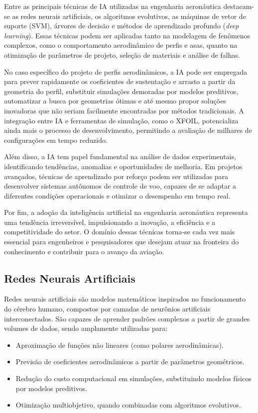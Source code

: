 Entre as principais técnicas de IA utilizadas na engenharia aeronáutica destacam-se as redes neurais artificiais, os algoritmos evolutivos, as máquinas de vetor de suporte (SVM), árvores de decisão e métodos de aprendizado profundo (\textit{deep learning}). Essas técnicas podem ser aplicadas tanto na modelagem de fenômenos complexos, como o comportamento aerodinâmico de perfis e asas, quanto na otimização de parâmetros de projeto, seleção de materiais e análise de falhas.

No caso específico do projeto de perfis aerodinâmicos, a IA pode ser empregada para prever rapidamente os coeficientes de sustentação e arrasto a partir da geometria do perfil, substituir simulações demoradas por modelos preditivos, automatizar a busca por geometrias ótimas e até mesmo propor soluções inovadoras que não seriam facilmente encontradas por métodos tradicionais. A integração entre IA e ferramentas de simulação, como o XFOIL, potencializa ainda mais o processo de desenvolvimento, permitindo a avaliação de milhares de configurações em tempo reduzido.

Além disso, a IA tem papel fundamental na análise de dados experimentais, identificando tendências, anomalias e oportunidades de melhoria. Em projetos avançados, técnicas de aprendizado por reforço podem ser utilizadas para desenvolver sistemas autônomos de controle de voo, capazes de se adaptar a diferentes condições operacionais e otimizar o desempenho em tempo real.

Por fim, a adoção da inteligência artificial na engenharia aeronáutica representa uma tendência irreversível, impulsionando a inovação, a eficiência e a competitividade do setor. O domínio dessas técnicas torna-se cada vez mais essencial para engenheiros e pesquisadores que desejam atuar na fronteira do conhecimento e contribuir para o avanço da aviação.

\subsection{Redes Neurais Artificiais}
Redes neurais artificiais são modelos matemáticos inspirados no funcionamento do cérebro humano, compostos por camadas de neurônios artificiais interconectados. São capazes de aprender padrões complexos a partir de grandes volumes de dados, sendo amplamente utilizadas para:

\begin{itemize}
    \item Aproximação de funções não lineares (como polares aerodinâmicas).
    \item Previsão de coeficientes aerodinâmicos a partir de parâmetros geométricos.
    \item Redução do custo computacional em simulações, substituindo modelos físicos por modelos preditivos.
    \item Otimização multiobjetivo, quando combinadas com algoritmos evolutivos.
\end{itemize}


